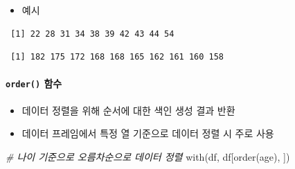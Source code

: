 \documentclass[
  11pt,
]{krantz}
\newenvironment{Shaded}{\begin{snugshade}}{\end{snugshade}}
\newcommand{\AttributeTok}[1]{\textcolor[rgb]{0.61,0.61,0.61}{#1}}
\newcommand{\CommentTok}[1]{\textcolor[rgb]{0.37,0.37,0.37}{\textit{#1}}}
\newcommand{\ConstantTok}[1]{\textcolor[rgb]{0,0,0}{#1}}
\newcommand{\FunctionTok}[1]{\textcolor[rgb]{0,0,0}{#1}}
\newcommand{\NormalTok}[1]{#1}
\newcommand{\SpecialCharTok}[1]{\textcolor[rgb]{0,0,0}{#1}}
\providecommand{\tightlist}{%
  \setlength{\itemsep}{0pt}\setlength{\parskip}{0pt}}
\begin{document}
\normalsize

\begin{itemize}
\tightlist
\item
  예시
\end{itemize}

\footnotesize

\begin{Shaded}
\end{Shaded}

\begin{verbatim}
 [1] 22 28 31 34 38 39 42 43 44 54
\end{verbatim}

\begin{Shaded}
\end{Shaded}

\begin{verbatim}
 [1] 182 175 172 168 168 165 162 161 160 158
\end{verbatim}

\normalsize

\hypertarget{order}{%
\paragraph*{\texorpdfstring{\texttt{order()} 함수}{order() 함수}}\label{order}}

\begin{itemize}
\tightlist
\item
  데이터 정렬을 위해 순서에 대한 색인 생성 결과 반환
\item
  데이터 프레임에서 특정 열 기준으로 데이터 정렬 시 주로 사용
\end{itemize}

\footnotesize

\begin{Shaded}
\begin{Highlighting}[]
\CommentTok{\# 나이 기준으로 오름차순으로 데이터 정렬}
\FunctionTok{with}\NormalTok{(df, df[}\FunctionTok{order}\NormalTok{(age), ])}
\end{Highlighting}
\end{Shaded}
\end{document}
